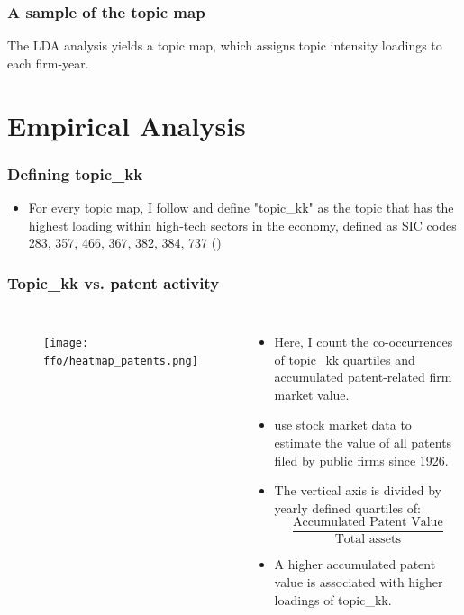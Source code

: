 \documentclass{beamer}
\newcommand{\ffo}{dicfullmc10thr10defnob40noa0_8_4t}
\begin{document}
\begin{frame}
  \frametitle{A sample of the topic map}
The LDA analysis yields a topic map, which assigns topic intensity loadings to each firm-year.
   \tiny
  
\end{frame}


\section{Empirical Analysis}

\begin{frame}
\label{defining_kk}
  \frametitle{Defining topic\_kk}
  \begin{itemize}
  \item For every topic map, I follow \cite{Brown2009-zp} and define "topic\_kk" as the topic that has the highest loading within high-tech sectors in the economy, defined as SIC codes 283, 357, 466, 367, 382, 384, 737 (\cite{Brown2009-zp}) 
  
\end{itemize}
 \end{frame}

\begin{frame}
\frametitle{Topic\_kk vs. patent activity}
       \begin{columns}
             \begin{figure}[h!]
		  \centering
		  \texttt{[image: \\ffo/heatmap\_patents.png]}
		  \captionsetup{font=scriptsize}
		  \label{fig:firmsbypathm}
			\end{figure}
          \scriptsize
              \begin{itemize}
              \item Here, I count the co-occurrences of topic\_kk quartiles and accumulated patent-related firm market value.
              \item \cite{Kogan2017-fx} use stock market data to estimate the value of all patents filed by public firms since 1926.
			  \item The vertical axis is divided by yearly defined quartiles of:
			  \begin{equation}
  				\frac{\text{Accumulated Patent Value}}{\text{Total assets}}
				\end{equation}
			  \item A higher accumulated patent value is associated with higher loadings of topic\_kk.
			\end{itemize}
	  \end{columns} 
\end{frame}
\end{document}
